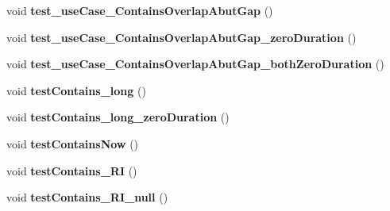 \begin{DoxyCompactItemize}
\item 
\hypertarget{classorg_1_1joda_1_1time_1_1_test_interval___basics_a7d33e11f9affb63a9f7775a733ee484c}{void {\bfseries test\-\_\-use\-Case\-\_\-\-Contains\-Overlap\-Abut\-Gap} ()}\label{classorg_1_1joda_1_1time_1_1_test_interval___basics_a7d33e11f9affb63a9f7775a733ee484c}

\item 
\hypertarget{classorg_1_1joda_1_1time_1_1_test_interval___basics_aa9a50449b181e52923871262fe1e058a}{void {\bfseries test\-\_\-use\-Case\-\_\-\-Contains\-Overlap\-Abut\-Gap\-\_\-zero\-Duration} ()}\label{classorg_1_1joda_1_1time_1_1_test_interval___basics_aa9a50449b181e52923871262fe1e058a}

\item 
\hypertarget{classorg_1_1joda_1_1time_1_1_test_interval___basics_a245ce4d2d825cb6b3e882decef9ce933}{void {\bfseries test\-\_\-use\-Case\-\_\-\-Contains\-Overlap\-Abut\-Gap\-\_\-both\-Zero\-Duration} ()}\label{classorg_1_1joda_1_1time_1_1_test_interval___basics_a245ce4d2d825cb6b3e882decef9ce933}

\item 
\hypertarget{classorg_1_1joda_1_1time_1_1_test_interval___basics_a24aac3f83ed4e94d66eb047bfa5602d4}{void {\bfseries test\-Contains\-\_\-long} ()}\label{classorg_1_1joda_1_1time_1_1_test_interval___basics_a24aac3f83ed4e94d66eb047bfa5602d4}

\item 
\hypertarget{classorg_1_1joda_1_1time_1_1_test_interval___basics_afadd34a20d1816a01d1ca36776db6fa4}{void {\bfseries test\-Contains\-\_\-long\-\_\-zero\-Duration} ()}\label{classorg_1_1joda_1_1time_1_1_test_interval___basics_afadd34a20d1816a01d1ca36776db6fa4}

\item 
\hypertarget{classorg_1_1joda_1_1time_1_1_test_interval___basics_a99034c8ab700253a905a87ed6e630e26}{void {\bfseries test\-Contains\-Now} ()}\label{classorg_1_1joda_1_1time_1_1_test_interval___basics_a99034c8ab700253a905a87ed6e630e26}

\item 
\hypertarget{classorg_1_1joda_1_1time_1_1_test_interval___basics_a0b8e5533c60a1c58aa61a21b51445c3a}{void {\bfseries test\-Contains\-\_\-\-R\-I} ()}\label{classorg_1_1joda_1_1time_1_1_test_interval___basics_a0b8e5533c60a1c58aa61a21b51445c3a}

\item 
\hypertarget{classorg_1_1joda_1_1time_1_1_test_interval___basics_a650458fa107f2ac3aef26b0a73980b6a}{void {\bfseries test\-Contains\-\_\-\-R\-I\-\_\-null} ()}\label{classorg_1_1joda_1_1time_1_1_test_interval___basics_a650458fa107f2ac3aef26b0a73980b6a}


\end{DoxyCompactItemize}

